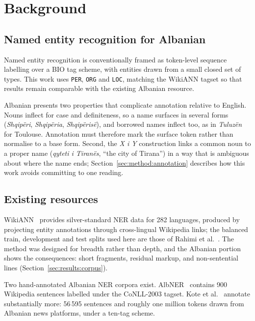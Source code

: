 \section{Background}
\label{sec:background}

\subsection{Named entity recognition for Albanian}

Named entity recognition is conventionally framed as token-level sequence labelling over a BIO tag scheme, with entities drawn from a small closed set of types. This work uses \texttt{PER}, \texttt{ORG} and \texttt{LOC}, matching the WikiANN tagset so that results remain comparable with the existing Albanian resource.

Albanian presents two properties that complicate annotation relative to English. Nouns inflect for case and definiteness, so a name surfaces in several forms (\emph{Shqipëri}, \emph{Shqipëria}, \emph{Shqipërisë}), and borrowed names inflect too, as in \emph{Tuluzën} for Toulouse. Annotation must therefore mark the surface token rather than normalise to a base form. Second, the \emph{X i Y} construction links a common noun to a proper name (\emph{qyteti i Tiranës}, ``the city of Tirana'') in a way that is ambiguous about where the name ends; Section~\ref{sec:method:annotation} describes how this work avoids committing to one reading.

\subsection{Existing resources}

WikiANN~\cite{bib:wikiann} provides silver-standard NER data for 282 languages, produced by projecting entity annotations through cross-lingual Wikipedia links; the balanced train, development and test splits used here are those of Rahimi et al.~\cite{bib:wikiann-splits}. The method was designed for breadth rather than depth, and the Albanian portion shows the consequences: short fragments, residual markup, and non-sentential lines (Section~\ref{sec:results:corpus}).

Two hand-annotated Albanian NER corpora exist. AlbNER~\cite{bib:albner} contains 900 Wikipedia sentences labelled under the CoNLL-2003 tagset. Kote et al.~\cite{bib:kote2025} annotate substantially more: 56\,595 sentences and roughly one million tokens drawn from Albanian news platforms, under a ten-tag scheme.

